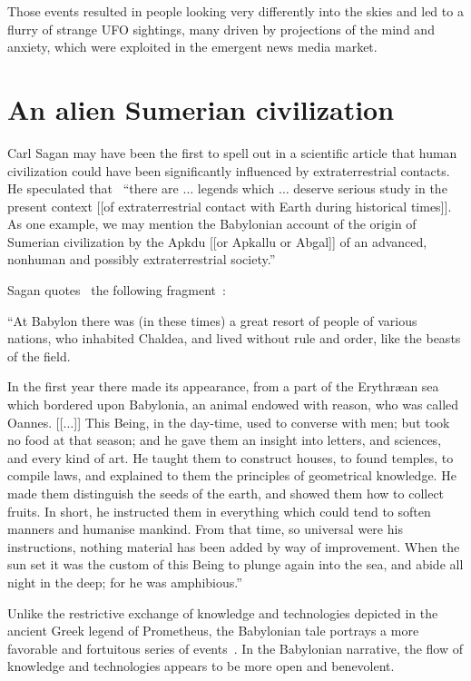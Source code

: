 Those events resulted in people looking very differently into the skies and led to a flurry of strange UFO sightings, many driven by projections of the mind and anxiety, which were exploited in the emergent news media market.

\section{An alien Sumerian civilization}
\label{2023-UFO-part-History-chapter-pre-1945-asc}

Carl Sagan may have been the first to spell out in a scientific article
that human civilization could have been significantly influenced by extraterrestrial contacts.
He speculated that~\cite[p.~496]{Sagan_1963} ``there are  $\ldots$ legends which  $\ldots$
deserve serious study in the present context [[of extraterrestrial contact with Earth during
historical times]]. As one example, we may mention the
Babylonian account of the origin of Sumerian civilization by the Apkdu [[or Apkallu or Abgal]]
of an advanced, nonhuman and possibly extraterrestrial society.''

Sagan quotes~\cite{Sagan_1963,Shklovskii1998Nov,Zygutis2016Nov}
the following fragment~\cite[pp.~56,57]{Cory1876Sep}:
\begin{svgraybox}
``At Babylon there was (in these times) a great resort of people of various nations, who inhabited Chaldea,
and lived without rule and order, like the beasts of the field.

In the first year there made its appearance, from
a part of the Erythr{\ae}an sea which bordered upon
Babylonia, an animal endowed with reason, who was
called Oannes.
[[$\ldots$]]
This Being, in the day-time, used to converse with
men; but took no food at that season; and he gave
them an insight into letters, and sciences, and every
kind of art. He taught them to construct houses,
to found temples, to compile laws, and explained to
them the principles of geometrical knowledge. He
made them distinguish the seeds of the earth, and
showed them how to collect fruits. In short, he
instructed them in everything which could tend to
soften manners and humanise mankind. From that
time, so universal were his instructions, nothing
material has been added by way of improvement.
When the sun set it was the custom of this Being to
plunge again into the sea, and abide all night in the
deep; for he was amphibious.''
\end{svgraybox}

Unlike the restrictive exchange of knowledge and technologies depicted in the ancient Greek legend of Prometheus,
the Babylonian tale portrays a more favorable and fortuitous series of events~\cite{Y_ld_r_m_2022}.
In the Babylonian narrative, the flow of knowledge and technologies
appears to be more open and benevolent.


